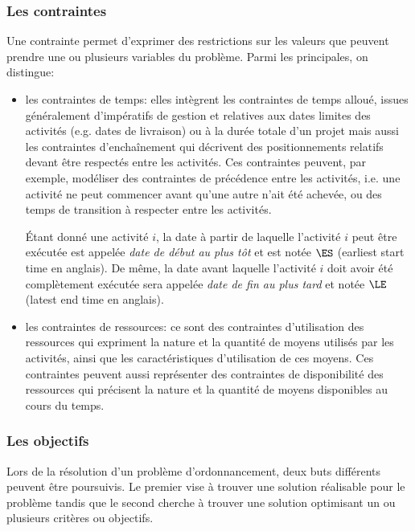 \subsubsection{Les contraintes}

Une contrainte permet d'exprimer des restrictions sur les valeurs que
peuvent prendre une ou plusieurs variables du problème. Parmi les
principales, on distingue:
\begin{itemize}
\item les contraintes de temps: elles intègrent les contraintes de
  temps alloué, issues généralement d'impératifs de gestion et
  relatives aux dates limites des activités (e.g. dates
    de livraison) ou à la durée totale d'un projet mais aussi les
    contraintes d'enchaînement qui décrivent des
    positionnements relatifs devant être respectés entre les
    activités. Ces contraintes peuvent, par exemple, modéliser des
    contraintes de précédence entre les activités, i.e. une activité
    ne peut commencer avant qu'une autre n'ait été achevée, ou des temps
    de transition à respecter entre les activités.

    {\'E}tant donné une activité $i$, la date à partir de laquelle
    l'activité $i$ peut être exécutée est appelée {\it date de début au
      plus tôt} et est notée $\ES$ (earliest start time en anglais). De
    même, la date avant laquelle l'activité $i$ doit avoir été
    complètement exécutée sera appelée {\it date de fin au plus tard} et
    notée $\LE$ (latest end time en anglais).

\item les contraintes de ressources:  ce sont des contraintes d'utilisation
  des ressources qui expriment la nature et la quantité de moyens
  utilisés par les activités, ainsi que les caractéristiques
  d'utilisation de ces moyens. Ces contraintes peuvent aussi représenter
  des contraintes de disponibilité des ressources qui précisent la
  nature et la quantité de moyens disponibles au cours du temps.
\end{itemize}

\subsubsection{Les objectifs}

Lors de la résolution d'un problème d'ordonnancement, deux buts
différents peuvent être poursuivis. Le premier vise à trouver une solution
réalisable pour le problème tandis que le second cherche à trouver une
solution optimisant un ou plusieurs critères ou objectifs.

